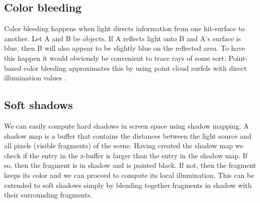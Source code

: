 \documentclass{ACGSeminar}
\begin{document}
	\subsection{Color bleeding}
		Color bleeding happens when light directs information from one hit-surface to another. Let A and B be objects. If A reflects light onto B and A's surface is blue, then B will also appear
		to be slightly blue on the reflected area. To have this happen it would obviously be convenient to trace rays of some sort. Point-based color bleeding approximates this by using point cloud surfels with direct illumination values \cite{PBCB}.

	\subsection{Soft shadows}
		We can easily compute hard shadows in screen space using shadow mapping. A shadow map is a buffer that contains the distances between the light source and all pixels (visible fragments) of the scene. Having created the shadow map we check if the entry in the z-buffer is larger than the entry in the shadow map. If so, then the fragment is in shadow and is painted black. If not, then the fragment keeps its color and we can proceed to compute its local illumination. This can be extended to soft shadows simply by blending together fragments in shadow with their surrounding fragments.
\end{document}

